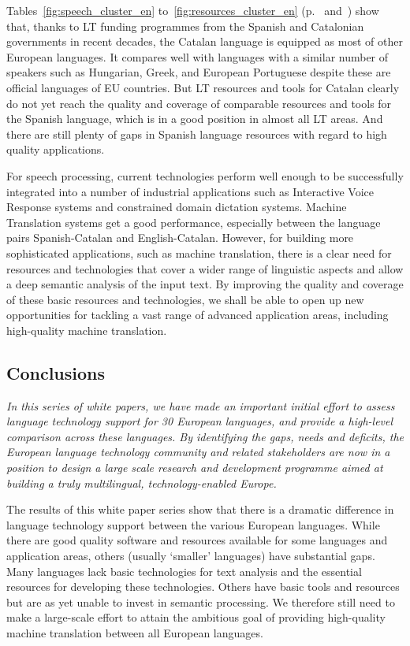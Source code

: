 \begin{multicols}{2}
Tables~\ref{fig:speech_cluster_en} to~\ref{fig:resources_cluster_en} (p.~\pageref{fig:speech_cluster_en} and~\pageref{fig:resources_cluster_en}) show that, thanks to LT funding programmes from the Spanish and Catalonian governments in recent decades, the Catalan language is equipped as most of other European languages. It compares well with languages with a similar number of speakers such as Hungarian, Greek, and European Portuguese despite these are official languages of EU countries. But LT resources and tools for Catalan clearly do not yet reach the quality and coverage of comparable resources and tools for the Spanish language, which is in a good position in almost all LT areas. And there are still plenty of gaps in Spanish language resources with regard to high quality applications.

For speech processing, current technologies perform well enough to be successfully integrated into a number of industrial applications such as Interactive Voice Response systems and constrained domain dictation systems. Machine Translation systems get a good performance, especially between the language pairs Spanish-Catalan and English-Catalan. However, for building more sophisticated applications, such as machine translation, there is a clear need for resources and technologies that cover a wider range of linguistic aspects and allow a deep semantic analysis of the input text. By improving the quality and coverage of these basic resources and technologies, we shall be able to open up new opportunities for tackling a vast range of advanced application areas, including high-quality machine translation.  

\subsection{Conclusions}

    \emph{In this series of white papers, we have made an important initial effort to assess language technology support for 30 European languages, and provide a high-level comparison across these languages. By identifying the gaps, needs and deficits, the European language technology community and related stakeholders are now in a position to design a large scale research and development programme aimed at building a truly multilingual, technology-enabled Europe.}

The results of this white paper series show that there is a dramatic difference in language technology support between the various European languages. While there are good quality software and resources available for some languages and application areas, others (usually ‘smaller’ languages) have substantial gaps. Many languages lack basic technologies for text analysis and the essential resources for developing these technologies. Others have basic tools and resources but are as yet unable to invest in semantic processing. We therefore still need to make a large-scale effort to attain the ambitious goal of providing high-quality machine translation between all European languages. 


\end{multicols}
